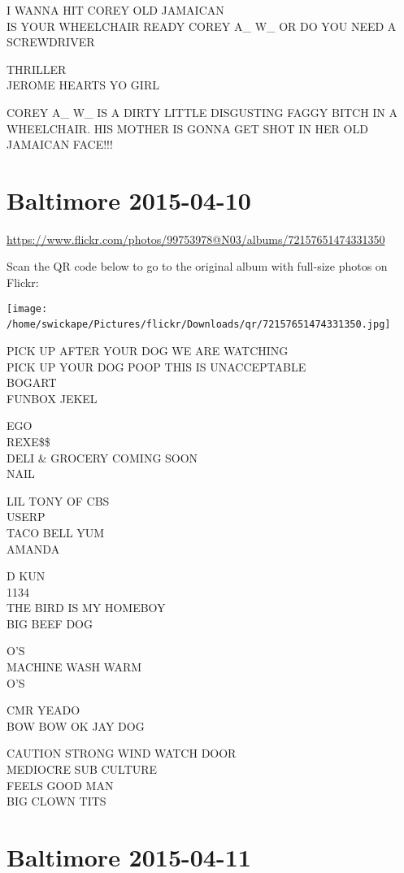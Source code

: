 \documentclass[10pt,letterpaper]{article}
\begin{document}
I WANNA HIT COREY OLD JAMAICAN\\
IS YOUR WHEELCHAIR READY COREY A\_ W\_ OR DO YOU NEED A SCREWDRIVER

THRILLER\\
JEROME HEARTS YO GIRL

COREY A\_ W\_ IS A DIRTY LITTLE DISGUSTING FAGGY BITCH IN A WHEELCHAIR.  HIS MOTHER IS GONNA GET SHOT IN HER OLD JAMAICAN FACE!!!
\

\section*{Baltimore 2015-04-10}

\url{https://www.flickr.com/photos/99753978@N03/albums/72157651474331350}

Scan the QR code below to go to the original album with full-size photos on Flickr:

\texttt{[image: /home/swickape/Pictures/flickr/Downloads/qr/72157651474331350.jpg]}
\

PICK UP AFTER YOUR DOG WE ARE WATCHING\\
PICK UP YOUR DOG POOP THIS IS UNACCEPTABLE\\
BOGART\\
FUNBOX JEKEL

EGO\\
REXE\$\$\\
DELI \& GROCERY COMING SOON\\
NAIL

LIL TONY OF CBS\\
USERP\\
TACO BELL YUM\\
AMANDA

D KUN\\
1134\\
THE BIRD IS MY HOMEBOY\\
BIG BEEF DOG

O'S\\
MACHINE WASH WARM\\
O'S

CMR YEADO\\
BOW BOW OK JAY DOG

CAUTION STRONG WIND WATCH DOOR\\
MEDIOCRE SUB CULTURE\\
FEELS GOOD MAN\\
BIG CLOWN TITS
\

\section*{Baltimore 2015-04-11}
\end{document}
